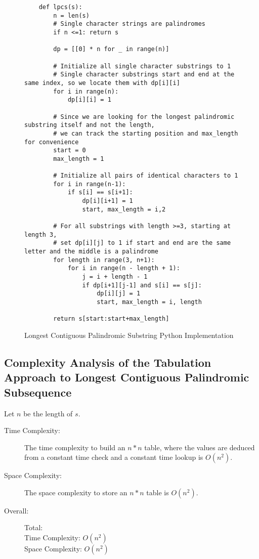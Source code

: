 \begin{figure}[H]
    \centering
    \begin{lstlisting}
    def lpcs(s):
        n = len(s)
        # Single character strings are palindromes
        if n <=1: return s

        dp = [[0] * n for _ in range(n)]
    
        # Initialize all single character substrings to 1
        # Single character substrings start and end at the same index, so we locate them with dp[i][i]
        for i in range(n):
            dp[i][i] = 1
    
        # Since we are looking for the longest palindromic substring itself and not the length,
        # we can track the starting position and max_length for convenience
        start = 0
        max_length = 1
    
        # Initialize all pairs of identical characters to 1
        for i in range(n-1):
            if s[i] == s[i+1]:
                dp[i][i+1] = 1
                start, max_length = i,2
    
        # For all substrings with length >=3, starting at length 3, 
        # set dp[i][j] to 1 if start and end are the same letter and the middle is a palindrome
        for length in range(3, n+1):
            for i in range(n - length + 1):
                j = i + length - 1
                if dp[i+1][j-1] and s[i] == s[j]:
                    dp[i][j] = 1
                    start, max_length = i, length
    
        return s[start:start+max_length]
    \end{lstlisting}
    \caption{Longest Contiguous Palindromic Substring Python Implementation}
    \label{fig:lpcs-dp}
\end{figure}

\subsection{Complexity Analysis of the Tabulation Approach to Longest Contiguous Palindromic Subsequence}
Let $n$ be the length of $s$.

\begin{description}
    \item[Time Complexity:]
        The time complexity to build an $n * n$ table,
        where the values are deduced from a constant time check and a constant time lookup is $O(n^2)$. 

    \item[Space Complexity:] 
        The space complexity to store an $n * n$ table is $O(n^2)$.

        
    \item[Overall:] Total:\\
        Time Complexity: $O(n^2)$\\
        Space Complexity: $O(n^2)$
    
\end{description}